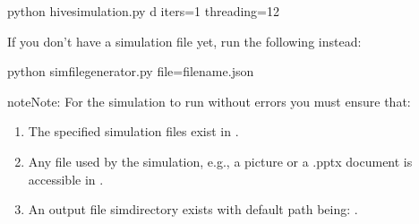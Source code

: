 \documentclass[letterpaper,10pt,english]{sphinxmanual}
\begin{document}
\begin{sphinxVerbatim}[commandchars=\\\{\}]
\PYGZdl{} python hive\PYGZus{}simulation.py \PYGZhy{}d \PYGZhy{}\PYGZhy{}iters=1 \PYGZhy{}\PYGZhy{}threading=12
\end{sphinxVerbatim}

If you don’t have a simulation file yet, run the following instead:

\begin{sphinxVerbatim}[commandchars=\\\{\}]
\PYGZdl{} python simfile\PYGZus{}generator.py \PYGZhy{}\PYGZhy{}file=filename.json
\end{sphinxVerbatim}

\begin{sphinxadmonition}{note}{Note:}
For the simulation to run without errors you must ensure that:
\begin{enumerate}
%
\item {} 
The specified simulation files exist in         {\hyperref[\detokenize{app:app.environment_settings.SIMULATION_ROOT}]{}}.

\item {} 
Any file used by the simulation, e.g., a picture or a .pptx         document is accessible in         {\hyperref[\detokenize{app:app.environment_settings.SHARED_ROOT}]{}}.

\item {} 
An output file simdirectory exists with default path being:         {\hyperref[\detokenize{app:app.environment_settings.OUTFILE_ROOT}]{}}.

\end{enumerate}
\end{sphinxadmonition}
\end{document}
